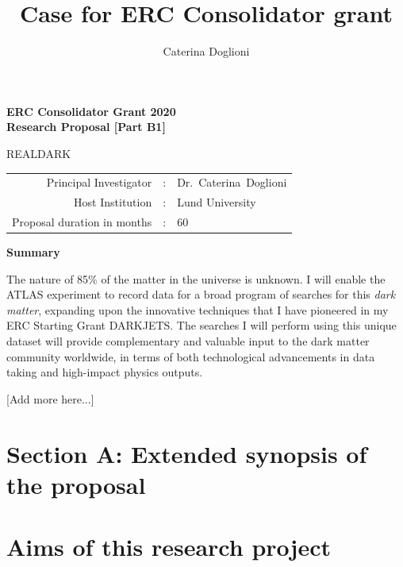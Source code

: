\documentclass[11pt,a4paper]{article}
\title{{\Large Case for ERC Consolidator grant}}
\author{{\normalsize Caterina Doglioni}}
\date{}                                           %
\begin{document}
\begin{center} 

{\Large\bf ERC Consolidator Grant 2020} \\
	{\Large\bf Research Proposal [Part B1]}  \\
 
\vspace{2cm} 
{\huge {\bf }}   \smallskip  

\vspace{2cm} 
{\Huge{REALDARK}} \\ 
\vspace{1cm} 
\vspace{1cm}
\end{center} 
\begin{tabular}{rcl}
Principal Investigator & : & Dr.~Caterina~Doglioni \\
Host Institution & : & Lund University \\ 
Proposal duration in months & : & 60 \\
\end{tabular}  
\vspace{2cm}


\begin{center} {\bf Summary}  \end{center}

The nature of 85\% of the matter in the universe is unknown. I will enable the ATLAS experiment to record data for a broad program of searches for this \textit{dark matter}, expanding upon the innovative techniques that I have pioneered in my ERC Starting Grant DARKJETS. 
The searches I will perform using this unique dataset will provide complementary and valuable input to the dark matter community worldwide, in terms of both technological advancements in data taking and high-impact physics outputs. 

[Add more here...]

\clearpage

\section*{Section A: Extended synopsis of the proposal} 

\medskip

\section{Aims of this research project} 
\smallskip
\end{document}
